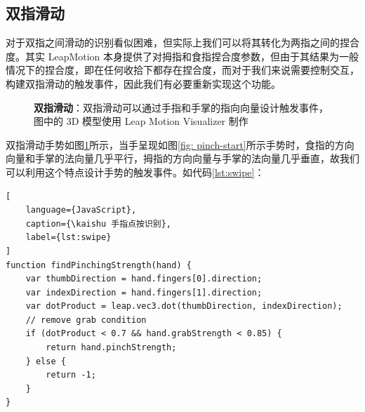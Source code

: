\subsection{双指滑动}

对于双指之间滑动的识别看似困难，但实际上我们可以将其转化为两指之间的捏合度。其实 LeapMotion 本身提供了对拇指和食指捏合度参数，但由于其结果为一般情况下的捏合度，即在任何收拾下都存在捏合度，而对于我们来说需要控制交互，构建双指滑动的触发事件，因此我们有必要重新实现这个功能。

\begin{figure}[H]
\kaishu
\centering
{}
\caption{\textbf{双指滑动}：双指滑动可以通过手指和手掌的指向向量设计触发事件，图中的 3D 模型使用 Leap Motion Visualizer 制作}
\label{fig:pinch}
\end{figure}

双指滑动手势如图\ref{fig:pinch}所示，当手呈现如图\ref{fig: pinch-start}所示手势时，食指的方向向量和手掌的法向量几乎平行，拇指的方向向量与手掌的法向量几乎垂直，故我们可以利用这个特点设计手势的触发事件。如代码\ref{lst:swipe}：

\begin{lstlisting}[
    language={JavaScript},
    caption={\kaishu 手指点按识别},
    label={lst:swipe}
]
function findPinchingStrength(hand) {
    var thumbDirection = hand.fingers[0].direction;
    var indexDirection = hand.fingers[1].direction;
    var dotProduct = leap.vec3.dot(thumbDirection, indexDirection);
    // remove grab condition
    if (dotProduct < 0.7 && hand.grabStrength < 0.85) {
        return hand.pinchStrength;
    } else {
        return -1;
    }
}
\end{lstlisting}

